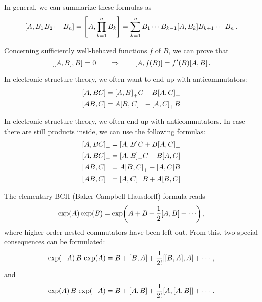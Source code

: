     In general, we can summarize these formulas as
    \begin{equation}
        \comm{A}{B_1 B_2 \cdots B_n} = \comm{A}{\prod_{k=1}^n B_k} = \sum_{k=1}^n B_1 \cdots B_{k-1} \comm{A}{B_k} B_{k+1} \cdots B_n \thinspace .
    \end{equation}

    Concerning sufficiently well-behaved functions $f$ of $B$, we can prove that
    \begin{equation}
        \comm{\comm{A}{B}}{B} = 0 \qquad\Rightarrow\qquad \comm{A}{f(B)} = f'(B) \comm{A}{B} \thinspace .
    \end{equation}

    In electronic structure theory, we often want to end up with anticommutators:
    \begin{align}
        & \comm{A}{BC} = \comm{A}{B}_+ C - B \comm{A}{C}_+ \\
        & \comm{AB}{C} = A \comm{B}{C}_+ - \comm{A}{C}_+ B
    \end{align}

    In electronic structure theory, we often end up with anticommutators. In case there are still products inside, we can use the following formulas:
    \begin{align}
        & \comm{A}{BC}_+ = \comm{A}{B} C + B \comm{A}{C}_+ \\
        & \comm{A}{BC}_+ = \comm{A}{B}_+ C - B \comm{A}{C} \\
        & \comm{AB}{C}_+ = A \comm{B}{C}_+ - \comm{A}{C} B \\
        & \comm{AB}{C}_+ = \comm{A}{C}_+ B + A \comm{B}{C}
    \end{align}

    The elementary BCH (Baker-Campbell-Hausdorff) formula reads
    \begin{equation}
        \exp(A) \exp(B) = \exp(A + B + \frac{1}{2} \comm{A}{B} + \cdots) \thinspace ,
    \end{equation}
    where higher order nested commutators have been left out. From this, two special consequences can be formulated:
    \begin{equation}
        \exp(-A) \thinspace B \thinspace \exp(A) = B + \comm{B}{A} + \frac{1}{2!} \comm{\comm{B}{A}}{A} + \cdots \thinspace ,
    \end{equation}
    and
    \begin{equation}
        \exp(A) \thinspace B \thinspace \exp(-A) = B + \comm{A}{B} + \frac{1}{2!} \comm{A}{\comm{A}{B}} + \cdots \thinspace .
    \end{equation}
